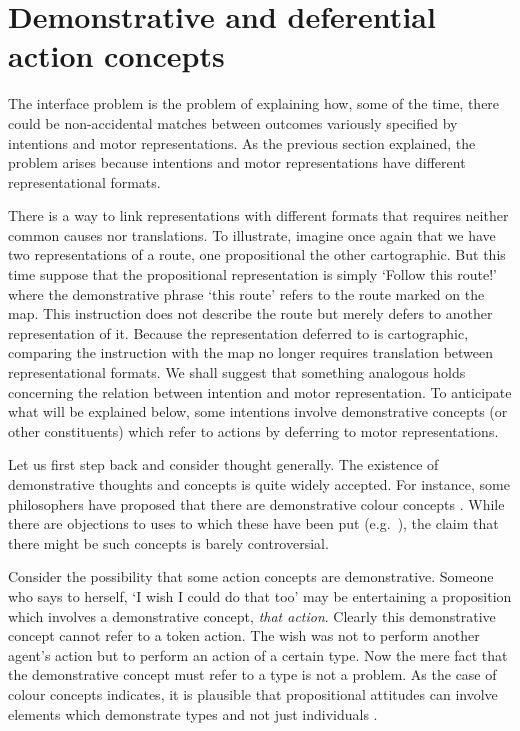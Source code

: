 \documentclass[12pt,\papersize]{extarticle}
\begin{document}
\section{Demonstrative and deferential action concepts}

The interface problem is the problem of explaining how, some of the time, there could be non-accidental matches between outcomes variously specified by intentions and motor representations. As the previous section explained, the problem arises because intentions and motor representations have different representational formats.

There is a way to link representations with different formats that requires neither common causes nor translations. To illustrate, imagine once again that we have two representations of a route, one propositional the other cartographic. But this time suppose that the propositional representation is simply `Follow this route!' where the demonstrative phrase `this route' refers to the route marked on the map. This instruction does not describe the route but merely defers to another representation of it. Because the representation deferred to is cartographic, comparing the instruction with the map no longer requires translation between representational formats. We shall suggest that something analogous holds concerning the relation between intention and motor representation. To anticipate what will be explained below, some intentions involve demonstrative concepts (or other constituents) which refer to actions by deferring to motor representations.

Let us first step back and consider thought generally. The existence of demonstrative thoughts and concepts is quite widely accepted. For instance, some philosophers have proposed that there are demonstrative colour concepts \citep{McDowell:1996yi,Brewer:1999ud}.  While there are objections to uses to which these have been put (e.g.\ \citealp{heck_jr._nonconceptual_2000,dokic_shades_2001}), the claim that there might be such concepts is barely controversial.

Consider the possibility that some action concepts are demonstrative. Someone who says to herself, `I wish I could do that too' may be entertaining a proposition which involves a demonstrative concept, \emph{that action}. Clearly this demonstrative concept cannot refer to a token action.  The wish was not to perform another agent's action but to perform an action of a certain type. Now the mere fact that the demonstrative concept must refer to a type is not a problem. As the case of colour concepts indicates, it is plausible that propositional attitudes can involve elements which demonstrate types and not just individuals \citep[see also][§3.4]{levine:2010_demonstrative}.
\end{document}
